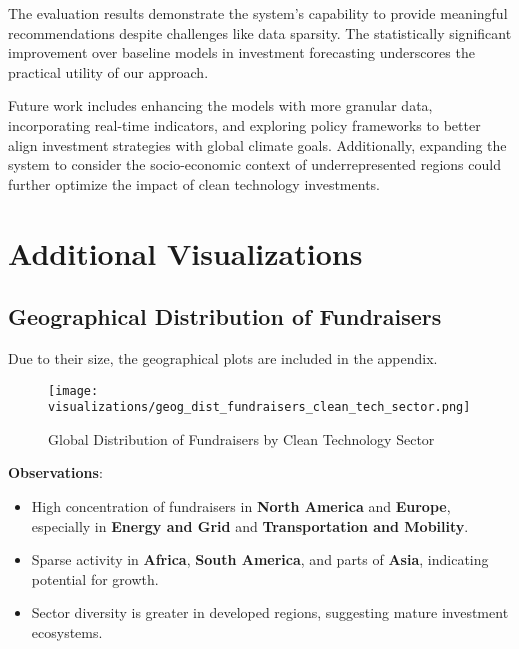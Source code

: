 \documentclass[sigconf]{acmart}
\begin{document}
The evaluation results demonstrate the system's capability to provide meaningful recommendations despite challenges like data sparsity. The statistically significant improvement over baseline models in investment forecasting underscores the practical utility of our approach.

Future work includes enhancing the models with more granular data, incorporating real-time indicators, and exploring policy frameworks to better align investment strategies with global climate goals. Additionally, expanding the system to consider the socio-economic context of underrepresented regions could further optimize the impact of clean technology investments.




\appendix

\section{Additional Visualizations}

\subsection{Geographical Distribution of Fundraisers}

Due to their size, the geographical plots are included in the appendix.

\begin{figure*}[htpb]
    \centering
    \texttt{[image: visualizations/geog\_dist\_fundraisers\_clean\_tech\_sector.png]}
    \caption{Global Distribution of Fundraisers by Clean Technology Sector}
    \label{fig:global_distribution}
\end{figure*}

\textbf{Observations}:

\begin{itemize}
    \item High concentration of fundraisers in \textbf{North America} and \textbf{Europe}, especially in \textbf{Energy and Grid} and \textbf{Transportation and Mobility}.
    \item Sparse activity in \textbf{Africa}, \textbf{South America}, and parts of \textbf{Asia}, indicating potential for growth.
    \item Sector diversity is greater in developed regions, suggesting mature investment ecosystems.
\end{itemize}
\end{document}
